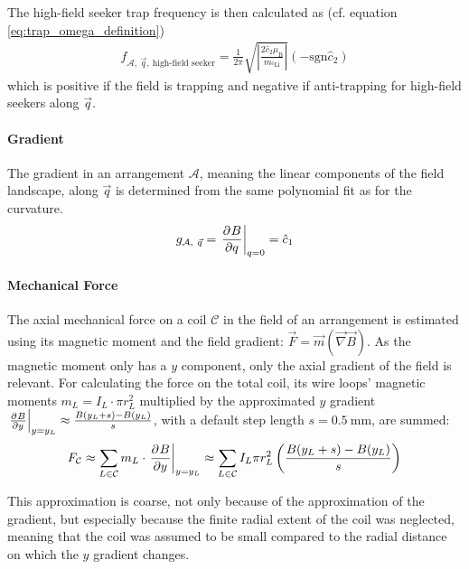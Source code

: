 The high-field seeker trap frequency is then calculated as (cf. equation \ref{eq:trap_omega_definition})
\begin{align}\label{eq:trap_frequency_simulation}
    f_{\mathcal{A},~\vec q,~\text{high-field seeker}} = \frac{1}{2\pi}  \sqrt{\left| \frac{2 \hat c_2 \mu_\text{B}}{m_{^6\text{Li}}} \right|} (-\mathrm{sgn} \hat c_2)
\end{align}
which is positive if the field is trapping and negative if anti-trapping for high-field seekers along $\vec q$.

\paragraph{Gradient}
The gradient in an arrangement $\mathcal{A}$, meaning the linear components of the field landscape, along $\vec q$ is determined from the same polynomial fit as for the curvature.
\begin{align}\label{eq:gradient_simulation}
    g_{\mathcal{A},~\vec q} = \eval{\pdv[]{B}{q}}_{q = 0} = \hat c_1
\end{align}

\paragraph{Mechanical Force}
The axial mechanical force on a coil $\mathcal{C}$ in the field of an arrangement is estimated using its magnetic moment and the field gradient: $\vec F = \vec m (\vec \nabla \vec B)$. As the magnetic moment only has a $y$ component, only the axial gradient of the field is relevant. For calculating the force on the total coil, its wire loops' magnetic moments $m_L = I_L \cdot \pi r_L^2$ multiplied by the approximated $y$ gradient $\eval{\pdv[]{B}{y}}_{y = y_L} \approx \frac{B(y_L + s) - B(y_L)}{s}$, with a default step length $s = \SI{0.5}{\milli\meter}$, are summed:
\begin{align}\label{eq:mechanical_force_simulation}
    F_\mathcal{C} \approx \sum\limits_{L \in \mathcal{C}} m_L \cdot \eval{\pdv[]{B}{y}}_{y = y_L} \approx \sum\limits_{L \in \mathcal{C}} I_L \pi r_L^2 \left(\frac{B(y_L + s)-B(y_L)}{s}\right)
\end{align}

This approximation is coarse, not only because of the approximation of the gradient, but especially because the finite radial extent of the coil was neglected, meaning that the coil was assumed to be small compared to the radial distance on which the $y$ gradient changes.




